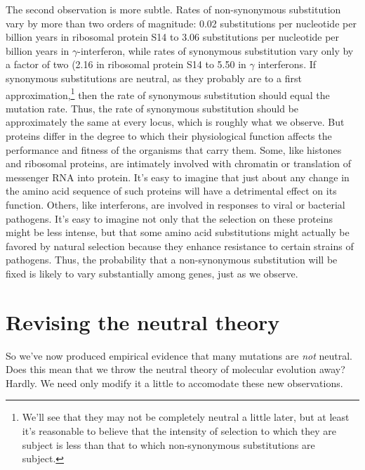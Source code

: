 The second observation is more subtle. Rates of non-synonymous
substitution vary by more than two orders of magnitude: 0.02
substitutions per nucleotide per billion years in ribosomal protein
S14 to 3.06 substitutions per nucleotide per billion years in
$\gamma$-interferon, while rates of synonymous substitution vary only
by a factor of two (2.16 in ribosomal protein S14 to 5.50 in $\gamma$
interferons. If synonymous substitutions are neutral, as they probably are to
a first approximation,\footnote{We'll see that they may not be
  completely neutral a little later, but at least it's reasonable to
  believe that the intensity of selection to which they are subject is
  less than that to which non-synonymous substitutions are subject.}
then the rate of synonymous substitution should equal the mutation
rate. Thus, the rate of synonymous substitution should be
approximately the same at every locus, which is roughly what we
observe. But proteins differ in the degree to which their
physiological function affects the performance and fitness of the
organisms that carry them. Some, like histones and ribosomal proteins,
are intimately involved with chromatin or translation of messenger RNA
into protein. It's easy to imagine that just about any change in the
amino acid sequence of such proteins will have a detrimental effect on
its function. Others, like interferons, are involved in responses to
viral or bacterial pathogens. It's easy to imagine not only that the
selection on these proteins might be less intense, but that some amino
acid substitutions might actually be favored by natural selection
because they enhance resistance to certain strains of pathogens. Thus,
the probability that a non-synonymous substitution will be fixed is
likely to vary substantially among genes, just as we observe.

\section*{Revising the neutral theory}

So we've now produced empirical evidence that many mutations are {\it
  not\/} neutral. Does this mean that we throw the neutral theory of
molecular evolution away? Hardly. We need only modify it a little to
accomodate these new observations.

